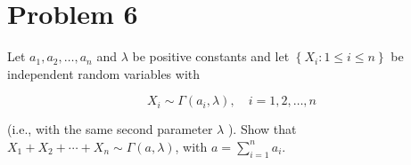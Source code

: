 \section{Problem 6}\label{hw04-problem-6}

Let \(\mathit{a}_{1},\mathit{a}_{2},\ldots,\mathit{a}_{\mathit{n}}\) and \(\mathit{\lambda}\) be positive constants and let \(\left\{ {\mathit{X}_{\mathit{i}}:1 \leq \mathit{i} \leq \mathit{n}} \right\}\) be independent random variables with

\[\mathit{X}_{\mathit{i}} \sim \Gamma\left( {\mathit{a}_{\mathit{i}},\mathit{\lambda}} \right),\quad\mathit{i} = 1,2,\ldots,\mathit{n}\]

(i.e., with the same second parameter \(\mathit{\lambda}\) ). Show that \(\mathit{X}_{1} + \mathit{X}_{2} + \cdots + \mathit{X}_{\mathit{n}} \sim \Gamma(\mathit{a},\mathit{\lambda})\), with \(\mathit{a} = \sum_{\mathit{i} = 1}^{\mathit{n}}\mathit{a}_{\mathit{i}}\).

